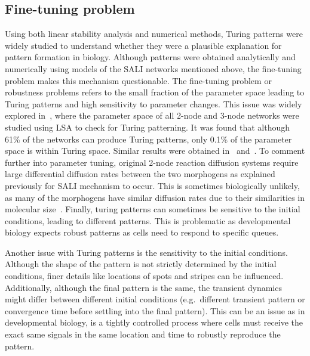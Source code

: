 \subsection{Fine-tuning problem}

Using both linear stability analysis and numerical methods, Turing patterns were widely studied to understand whether they were a plausible explanation for pattern formation in biology.
Although patterns were obtained analytically and numerically using models of the SALI networks mentioned above, the fine-tuning problem makes this mechanism questionable.
The fine-tuning problem or robustness problems refers to the small fraction of the parameter space leading to Turing patterns and high sensitivity to parameter changes.
This issue was widely explored in~\cite{Scholes2019}, where the parameter space of all 2-node and 3-node networks were studied using LSA to check for Turing patterning.
It was found that although 61\% of the networks can produce Turing patterns, only 0.1\% of the parameter space is within Turing space.
Similar results were obtained in~\cite{Zheng2016} and~\cite{Marcon}.
To comment further into parameter tuning, original 2-node reaction diffusion systems require large differential diffusion rates between the two morphogens as explained previously for SALI mechanism to occur.
This is sometimes biologically unlikely, as many of the morphogens have similar diffusion rates due to their similarities in molecular size~\parencite{huidobro}.
Finally, turing patterns can sometimes be sensitive to the initial conditions, leading to different patterns.
This is problematic as developmental biology expects robust patterns as cells need to respond to specific queues.   %

Another issue with Turing patterns is the sensitivity to the initial conditions.
Although the shape of the pattern is not strictly determined by the initial conditions, finer details like locations of spots and stripes can be influenced.
Additionally, although the final pattern is the same, the transient dynamics might differ between different initial conditions (e.g.\ different transient pattern or convergence time before settling into the final pattern).
This can be an issue as in developmental biology, is a tightly controlled process where cells must receive the exact same signals in the same location and time to robustly reproduce the pattern. %





